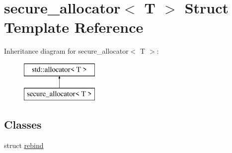 \hypertarget{structsecure__allocator}{}\section{secure\+\_\+allocator$<$ T $>$ Struct Template Reference}
\label{structsecure__allocator}
Inheritance diagram for secure\+\_\+allocator$<$ T $>$\+:\begin{figure}[H]
\begin{center}
\leavevmode
\includegraphics[height=2.000000cm]{structsecure__allocator}
\end{center}
\end{figure}
\subsection*{Classes}
\begin{DoxyCompactItemize}
\item 
struct \mbox{\hyperlink{structsecure__allocator_1_1rebind}{rebind}}
\end{DoxyCompactItemize}
